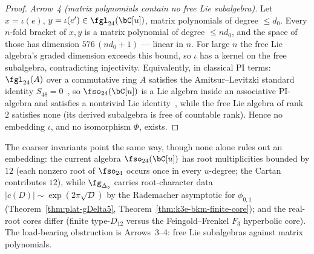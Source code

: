 \begin{proof}
\emph{Arrow~4 (matrix polynomials contain no free Lie subalgebra).}
Let $x = \iota(e)$, $y = \iota(e') \in \fgl_{24}(\bC[u])$, matrix
polynomials of degree $\leq d_0$. Every $n$-fold bracket of $x, y$
is a matrix polynomial of degree $\leq n d_0$, and the space of
those has dimension $576\,(n d_0 + 1)$ --- linear in $n$. For large
$n$ the free Lie algebra's graded dimension exceeds this bound, so
$\iota$ has a kernel on the free subalgebra, contradicting
injectivity. Equivalently, in classical PI terms:
$\fgl_{24}(A)$ over a commutative ring $A$ satisfies the
Amitsur--Levitzki standard identity
$S_{48} = 0$~\cite{AmitsurLevitzki50}, so $\fso_{24}(\bC[u])$ is a
Lie algebra inside an associative PI-algebra and satisfies a
nontrivial Lie identity~\cite{Bahturin87}, while the free Lie
algebra of rank $2$ satisfies none (its derived subalgebra is free
of countable rank). Hence no embedding $\iota$, and no isomorphism
$\Phi$, exists.
\end{proof}

\begin{remark}
\label{rem:k3yang-nonisom-corroboration}
The coarser invariants point the same way, though none alone rules
out an embedding: the current algebra $\fso_{24}(\bC[u])$ has root
multiplicities bounded by $12$ (each nonzero root of $\fso_{24}$
occurs once in every $u$-degree; the Cartan contributes $12$), while
$\fg_{\Delta_5}$ carries root-character data
$|c(D)| \sim \exp(2\pi\sqrt D)$ by the Rademacher asymptotic for
$\phi_{0,1}$ (Theorem~\ref{thm:plat-gDelta5},
Theorem~\ref{thm:k3e-bkm-finite-core}); and the real-root cores
differ (finite type-$D_{12}$ versus the Feingold--Frenkel $F_3$
hyperbolic core). The load-bearing obstruction is
Arrows~3--4: free Lie subalgebras against matrix polynomials.
\end{remark}

